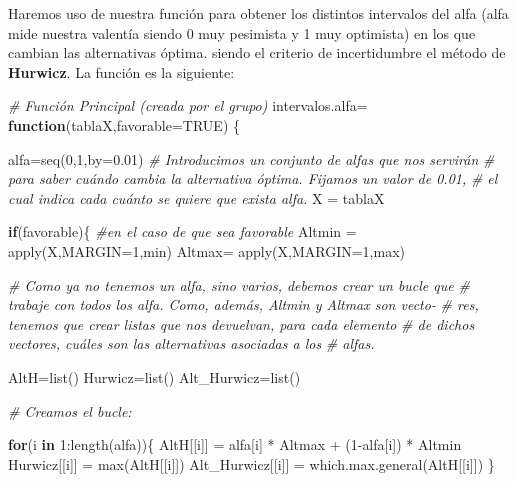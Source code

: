 \documentclass[
]{article}
\newenvironment{Shaded}{\begin{snugshade}}{\end{snugshade}}
\newcommand{\AttributeTok}[1]{\textcolor[rgb]{0.77,0.63,0.00}{#1}}
\newcommand{\CommentTok}[1]{\textcolor[rgb]{0.56,0.35,0.01}{\textit{#1}}}
\newcommand{\ConstantTok}[1]{\textcolor[rgb]{0.00,0.00,0.00}{#1}}
\newcommand{\ControlFlowTok}[1]{\textcolor[rgb]{0.13,0.29,0.53}{\textbf{#1}}}
\newcommand{\DecValTok}[1]{\textcolor[rgb]{0.00,0.00,0.81}{#1}}
\newcommand{\FloatTok}[1]{\textcolor[rgb]{0.00,0.00,0.81}{#1}}
\newcommand{\FunctionTok}[1]{\textcolor[rgb]{0.00,0.00,0.00}{#1}}
\newcommand{\NormalTok}[1]{#1}
\newcommand{\OtherTok}[1]{\textcolor[rgb]{0.56,0.35,0.01}{#1}}
\newcommand{\SpecialCharTok}[1]{\textcolor[rgb]{0.00,0.00,0.00}{#1}}
\begin{document}
Haremos uso de nuestra función para obtener los distintos intervalos del
alfa (alfa mide nuestra valentía siendo 0 muy pesimista y 1 muy
optimista) en los que cambian las alternativas óptima. siendo el
criterio de incertidumbre el método de \textbf{Hurwicz}. La función es
la siguiente:

\begin{Shaded}
\begin{Highlighting}[]
\CommentTok{\# Función Principal (creada por el grupo)}
\NormalTok{intervalos.alfa}\OtherTok{=} \ControlFlowTok{function}\NormalTok{(tablaX,}\AttributeTok{favorable=}\ConstantTok{TRUE}\NormalTok{) \{}
  
\NormalTok{  alfa}\OtherTok{=}\FunctionTok{seq}\NormalTok{(}\DecValTok{0}\NormalTok{,}\DecValTok{1}\NormalTok{,}\AttributeTok{by=}\FloatTok{0.01}\NormalTok{) }\CommentTok{\# Introducimos un conjunto de alfas que nos servirán}
  \CommentTok{\# para saber cuándo cambia la alternativa óptima. Fijamos un valor de 0.01,}
  \CommentTok{\# el cual indica cada cuánto se quiere que exista alfa.}
\NormalTok{  X }\OtherTok{=}\NormalTok{ tablaX}
  
  \ControlFlowTok{if}\NormalTok{(favorable)\{ }\CommentTok{\#en el caso de que sea favorable}
\NormalTok{    Altmin }\OtherTok{=} \FunctionTok{apply}\NormalTok{(X,}\AttributeTok{MARGIN=}\DecValTok{1}\NormalTok{,min)}
\NormalTok{    Altmax}\OtherTok{=} \FunctionTok{apply}\NormalTok{(X,}\AttributeTok{MARGIN=}\DecValTok{1}\NormalTok{,max)}
    
    \CommentTok{\# Como ya no tenemos un alfa, sino varios, debemos crear un bucle que}
    \CommentTok{\# trabaje con todos los alfa. Como, además, Altmin y Altmax son vecto{-}}
    \CommentTok{\# res, tenemos que crear listas que nos devuelvan, para cada elemento}
    \CommentTok{\# de dichos vectores, cuáles son las alternativas asociadas a los}
    \CommentTok{\# alfas.}
    
\NormalTok{    AltH}\OtherTok{=}\FunctionTok{list}\NormalTok{()}
\NormalTok{    Hurwicz}\OtherTok{=}\FunctionTok{list}\NormalTok{()}
\NormalTok{    Alt\_Hurwicz}\OtherTok{=}\FunctionTok{list}\NormalTok{()}
    
    \CommentTok{\# Creamos el bucle:}
    
    \ControlFlowTok{for}\NormalTok{(i }\ControlFlowTok{in} \DecValTok{1}\SpecialCharTok{:}\FunctionTok{length}\NormalTok{(alfa))\{}
\NormalTok{      AltH[[i]] }\OtherTok{=}\NormalTok{ alfa[i] }\SpecialCharTok{*}\NormalTok{ Altmax }\SpecialCharTok{+}\NormalTok{ (}\DecValTok{1}\SpecialCharTok{{-}}\NormalTok{alfa[i]) }\SpecialCharTok{*}\NormalTok{ Altmin}
\NormalTok{      Hurwicz[[i]] }\OtherTok{=} \FunctionTok{max}\NormalTok{(AltH[[i]])}
\NormalTok{      Alt\_Hurwicz[[i]] }\OtherTok{=} \FunctionTok{which.max.general}\NormalTok{(AltH[[i]])}
\NormalTok{    \}}
    

\end{Highlighting}
\end{Shaded}
\end{document}
